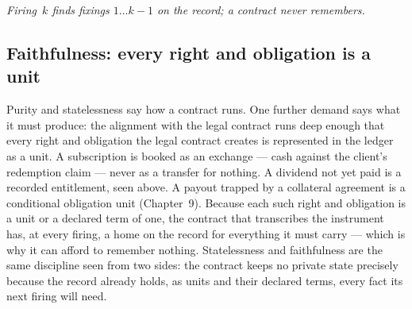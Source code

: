 \emph{Firing~$k$ finds fixings $1 \ldots k-1$ on the record; a contract never
remembers.}

\subsection{Faithfulness: every right and obligation is a unit}

Purity and statelessness say how a contract runs. One further demand says what it
must produce: the alignment with the legal contract runs deep enough that every
right and obligation the legal contract creates is represented in the ledger as
a unit. A subscription is booked as an exchange --- cash against the client's
redemption claim --- never as a transfer for nothing. A dividend not yet paid is
a recorded entitlement, seen above. A payout trapped by a collateral agreement
is a conditional obligation unit (Chapter~9). Because each such right and
obligation is a unit or a declared term of one, the contract that transcribes
the instrument has, at every firing, a home on the record for everything it must
carry --- which is why it can afford to remember nothing. Statelessness and
faithfulness are the same discipline seen from two sides: the contract keeps no
private state precisely because the record already holds, as units and their
declared terms, every fact its next firing will need.
